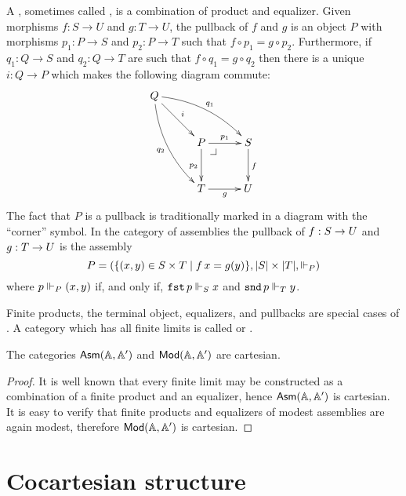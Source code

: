 A , sometimes called , is a
combination of product and equalizer. Given morphisms $f : S \to U$
and $g : T \to U$, the pullback of $f$ and $g$ is an object $P$ with
morphisms $p_1 : P \to S$ and $p_2 : P \to T$ such that $f \circ p_1 =
g \circ p_2$. Furthermore, if $q_1 : Q \to S$ and $q_2 : Q \to T$ are
such that $f \circ q_1 = g \circ q_2$ then there is a unique $i : Q
\to P$ which makes the following diagram commute:
%
\begin{equation*}
  \xymatrix@+0.5em{
    {Q}
    \ar[dr]^{i}
    \ar@/_1em/[ddr]_{q_2}
    \ar@/^1em/[rrd]^{q_1}
    &
    &
    \\
    &
    {P} \pbcorner
    \ar[r]^{p_1}
    \ar[d]_{p_2}
    &
    {S}
    \ar[d]^{f}
    \\
    &
    {T}
    \ar[r]_{g}
    &
    {U}
  }
\end{equation*}
%
The fact that $P$ is a pullback is traditionally marked in a diagram
with the ``corner'' symbol. In the category of assemblies the pullback
of $f : \asm{S} \to \asm{U}$ and $g : \asm{T} \to \asm{U}$ is the
assembly
%
\begin{equation*}
  \asm{P} = (\set{(x,y) \in S \times T \such f\,x = g(y)}, |S| \times
  |T|, {\rz[P]})
\end{equation*}
%
where $p \rz[P] (x,y)$ if, and only if, $\combFst\,p
\rz[S] x$ and $\combSnd\,p \rz[T] y$.

Finite products, the terminal object, equalizers, and pullbacks are
special cases of . A category which has all finite
limits is called  or .

\begin{proposition}
  \label{prop:asm-cartesian}%
  The categories $\AsmA$ and $\Mod{\AA, \subAA}$ are cartesian.
\end{proposition}

\begin{proof}
  It is well known that every finite limit may be constructed as a
  combination of a finite product and an equalizer, hence $\AsmA$ is
  cartesian. It is easy to verify that finite products and equalizers
  of modest assemblies are again modest, therefore $\Mod{\AA,
    \subAA}$ is cartesian.
\end{proof}


\section{Cocartesian structure}
\label{sec:cocartesian-structure}


